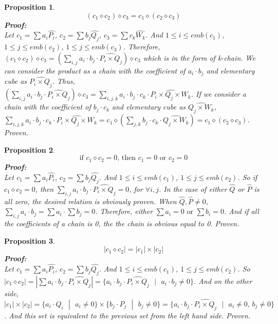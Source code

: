 \documentclass[12pt,letterpaper]{article}
\newtheorem{prop}{Proposition}
\begin{document}
\begin{normalsize}
\begin{prop}
$$(c_1 \diamond c_2) \diamond c_3 = c_1 \diamond (c_2 \diamond c_3)$$ 
\textbf{Proof:} \\
Let $c_1=\sum a_i \widehat{P_i}$, $c_2=\sum b_j \widehat{Q_j}$, $c_3=\sum c_k \widehat{W_k}$. And $1 \le i \le emb(c_1)$, $1 \le j \le emb(c_2)$, $1 \le j \le emb(c_3)$. Therefore, $(c_1 \diamond c_2) \diamond c_3 = (\sum_{i,j} a_i \cdot b_j \cdot \widehat{P_i \times Q_j}) \diamond c_3$ which is in the form of k-chain. We can consider the product as a chain with the coefficient of $a_i \cdot b_j$ and elementary cube as $\widehat{P_i \times Q_j}$. Thus,  $(\sum_{i,j} a_i \cdot b_j \cdot \widehat{P_i \times Q_j}) \diamond c_3=\sum_{i,j,k} a_i \cdot b_j \cdot c_k \cdot \widehat{P_i \times Q_j \times W_k} $. If we consider a chain with the coefficient of $b_j \cdot c_k$ and elementary cube as $\widehat{Q_j \times W_k}$, $\sum_{i,j,k} a_i \cdot b_j \cdot c_k \cdot \widehat{P_i \times Q_j \times W_k}= c_1 \diamond (\sum_{j,k} b_j \cdot c_k \cdot \widehat{Q_j \times W_k})=c_1 \diamond (c_2 \diamond c_3)$. Proven.
\\[20pt]
\end{prop}

\begin{prop}
$$\mbox{if } c_1 \diamond c_2=0 \mbox{, then } c_1=0 \mbox{ or } c_2=0$$ 
\textbf{Proof:} \\
Let $c_1=\sum a_i \widehat{P_i}$, $c_2=\sum b_j \widehat{Q_j}$. And $1 \le i \le emb(c_1)$, $1 \le j \le emb(c_2)$. So if $c_1 \diamond c_2=0$, then $\sum_{i,j}a_i \cdot b_j \cdot \widehat{P_i \times Q_j}=0$, for $\forall i,j$. In the case of either  $\widehat{Q}$ or  $\widehat{P}$ is all zero, the desired relation is obviously proven. When $\widehat{Q},\widehat{P} \neq 0$, $\sum_{i,j} a_i \cdot b_j=\sum a_i \cdot \sum b_j=0$. Therefore, either $\sum a_i=0 \mbox{ or } \sum b_i=0$. And if all the coefficients of a chain is 0, the the chain is obvious equal to 0. Proven.\\[20pt]
\end{prop}

\begin{prop}
$$|c_1 \diamond c_2|=|c_1| \times |c_2|$$ 
\textbf{Proof:} \\
Let $c_1=\sum a_i \widehat{P_i}$, $c_2=\sum b_j \widehat{Q_j}$. And $1 \le i \le emb(c_1)$, $1 \le j \le emb(c_2)$. So $|c_1 \diamond c_2|=|\sum a_i \cdot b_j \cdot \widehat{P_i \times Q_j}|=\{a_i \cdot b_j \cdot \widehat{P_i \times Q_j} \mbox{ } | \mbox{ }a_i \cdot b_j \neq 0\}$. And on the other side, $|c_1| \times |c_2|= \{a_i \cdot Q_i  \mbox{ } | \mbox{ }a_i \neq 0 \} \times \{b_j \cdot P_j  \mbox{ } | \mbox{ } b_j \neq 0 \}=\{a_i \cdot b_j \cdot \widehat{P_i \times Q_j} \mbox{ } | \mbox{ }a_i \neq 0 \mbox{, } b_j \neq 0\}$. And this set is equivalent to the previous set from the left hand side. Proven.
\end{prop}

\end{normalsize}
\end{document}
